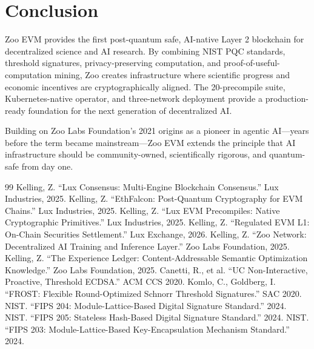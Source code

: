 \section{Conclusion}


Zoo EVM provides the first post-quantum safe, AI-native Layer 2 blockchain for decentralized science and AI research. By combining NIST PQC standards, threshold signatures, privacy-preserving computation, and proof-of-useful-computation mining, Zoo creates infrastructure where scientific progress and economic incentives are cryptographically aligned. The 20-precompile suite, Kubernetes-native operator, and three-network deployment provide a production-ready foundation for the next generation of decentralized AI.

Building on Zoo Labs Foundation's 2021 origins as a pioneer in agentic AI---years before the term became mainstream---Zoo EVM extends the principle that AI infrastructure should be community-owned, scientifically rigorous, and quantum-safe from day one.

\begin{thebibliography}{99}
 Kelling, Z. ``Lux Consensus: Multi-Engine Blockchain Consensus.'' Lux Industries, 2025.
 Kelling, Z. ``EthFalcon: Post-Quantum Cryptography for EVM Chains.'' Lux Industries, 2025.
 Kelling, Z. ``Lux EVM Precompiles: Native Cryptographic Primitives.'' Lux Industries, 2025.
 Kelling, Z. ``Regulated EVM L1: On-Chain Securities Settlement.'' Lux Exchange, 2026.
 Kelling, Z. ``Zoo Network: Decentralized AI Training and Inference Layer.'' Zoo Labs Foundation, 2025.
 Kelling, Z. ``The Experience Ledger: Content-Addressable Semantic Optimization Knowledge.'' Zoo Labs Foundation, 2025.
 Canetti, R., et al. ``UC Non-Interactive, Proactive, Threshold ECDSA.'' ACM CCS 2020.
 Komlo, C., Goldberg, I. ``FROST: Flexible Round-Optimized Schnorr Threshold Signatures.'' SAC 2020.
 NIST. ``FIPS 204: Module-Lattice-Based Digital Signature Standard.'' 2024.
 NIST. ``FIPS 205: Stateless Hash-Based Digital Signature Standard.'' 2024.
 NIST. ``FIPS 203: Module-Lattice-Based Key-Encapsulation Mechanism Standard.'' 2024.
\end{thebibliography}

